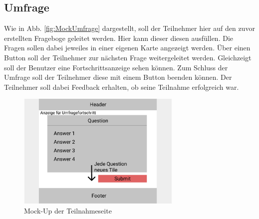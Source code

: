 \subsection{Umfrage}
\label{ssec:konzept:client:umfrage}
Wie in Abb. \vref{fig:MockUmfrage} dargestellt, soll der Teilnehmer hier auf den zuvor erstellten Frageboge geleitet werden. 
Hier kann dieser diesen ausfüllen.
Die Fragen sollen dabei jeweiles in einer eigenen Karte angezeigt werden.
Über einen Button soll der Teilnehmer zur nächsten Frage weitergeleitet werden. 
Gleichzeigt soll der Benutzer eine Fortschrittsanzeige sehen können.
Zum Schluss der Umfrage soll der Teilnehmer diese mit einem Button beenden können.
Der Teilnehmer soll dabei Feedback erhalten, ob seine Teilnahme erfolgreich war. 

\begin{figure}[h]
	\centering
	\includegraphics[width=0.7\textwidth]{img/konzeption/client/umfrage_teilnehmer}
	\captionsetup{justification=centering, format=plain}
	\caption[Mock-Up der Teilnahmeseite]{Mock-Up der Teilnahmeseite \\\figma}
	\label{fig:MockUmfrageTeilnehmer}
\end{figure}